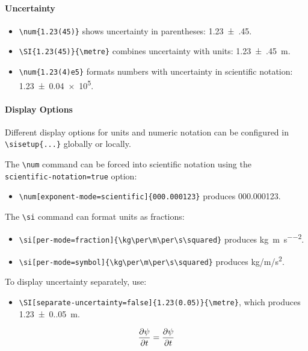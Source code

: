 \paragraph*{Uncertainty}

\begin{itemize}
    \item \verb|\num{1.23(45)}| shows uncertainty in parentheses: \num{1.23(45)}.
    \item \verb|\SI{1.23(45)}{\metre}| combines uncertainty with units: \SI{1.23(45)}{\metre}.
    \item \verb|\num{1.23(4)e5}| formats numbers with uncertainty in scientific notation: \num{1.23(4)e5}.
\end{itemize}

\paragraph*{Display Options}

Different display options for units and numeric notation can be configured in \verb|\sisetup{...}| globally or locally.

The \verb|\num| command can be forced into scientific notation using the\\
\verb|scientific-notation=true| option:

\begin{itemize}
    \item \verb|\num[exponent-mode=scientific]{000.000123}| produces \num[exponent-mode=scientific]{000.000123}.
\end{itemize}

The \verb|\si| command can format units as fractions:
\begin{itemize}
    \item \verb|\si[per-mode=fraction]{\kg\per\m\per\s\squared}| produces \si[per-mode=fraction]{\kg\per\m\per\s\squared}.
    \item \verb|\si[per-mode=symbol]{\kg\per\m\per\s\squared}| produces \si[per-mode=symbol]{\kg\per\m\per\s\squared}.
\end{itemize}

To display uncertainty separately, use:
\begin{itemize}
    \item \verb|\SI[separate-uncertainty=false]{1.23(0.05)}{\metre}|, which produces \SI[separate-uncertainty=false]{1.23(0.05)}{\metre}.
\end{itemize}







%
%


\begin{equation}
	\pdv{\psi}{t}
	=
	\frac{\partial \psi}{\partial t}
\end{equation}

